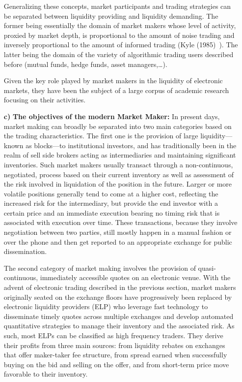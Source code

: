 \begin{enumerate}
Generalizing these concepts, market participants and trading strategies can be separated between liquidity providing and liquidity demanding. The former being essentially the domain of market makers whose level of activity, proxied by market depth, is proportional to the amount of noise trading and inversely proportional to the amount of informed trading (Kyle (1985)~\cite{kyle1985}). The latter being the domain of the variety of algorithmic trading users described before (mutual funds, hedge funds, asset managers,\dots).

Given the key role played by market makers in the liquidity of electronic markets, they have been the subject of a large corpus of academic research focusing on their activities. \twomedskip


\item[\textbf{c)}] \textbf{The objectives of the modern Market Maker:}
In present days, market making can broadly be separated into two main categories based on the trading characteristics. The first one is the provision of large liquidity---known as blocks---to institutional investors, and has traditionally been in the realm of sell side brokers acting as intermediaries and maintaining significant inventories. Such market makers usually transact through a non-continuous, negotiated, process based on their current inventory as well as assessment of the risk involved in liquidation of the position in the future. Larger or more volatile positions generally tend to come at a higher cost, reflecting the increased risk for the intermediary, but provide the end investor with a certain price and an immediate execution bearing no timing risk that is associated with execution over time. These transactions, because they involve negotiation between two parties, still mostly happen in a manual fashion or over the phone and then get reported to an appropriate exchange for public dissemination.

The second category of market making involves the provision of quasi-continuous, immediately accessible quotes on an electronic venue. With the advent of electronic trading described in the previous section, market makers originally seated on the exchange floors have progressively been replaced by electronic liquidity providers (ELP) who leverage fast technology to disseminate timely quotes across multiple exchanges and develop automated quantitative strategies to manage their inventory and the associated risk. As such, most ELPs can be classified as high frequency traders. They derive their profits from three main sources: from liquidity rebates on exchanges that offer maker-taker fee structure, from spread earned when successfully buying on the bid and selling on the offer, and from short-term price move favorable to their inventory. 


\end{enumerate}
